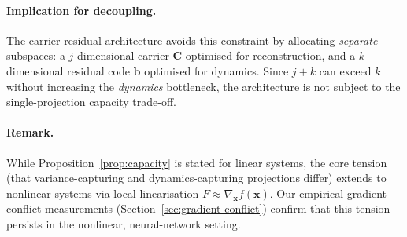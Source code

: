 \paragraph{Implication for decoupling.}
The carrier-residual architecture avoids this constraint by allocating
\emph{separate} subspaces: a $j$-dimensional carrier $\mathbf{C}$
optimised for reconstruction, and a $k$-dimensional residual code
$\mathbf{b}$ optimised for dynamics.  Since $j + k$ can exceed $k$
without increasing the \emph{dynamics} bottleneck, the architecture
is not subject to the single-projection capacity trade-off.

\paragraph{Remark.}
While Proposition~\ref{prop:capacity} is stated for linear systems, the
core tension (that variance-capturing and dynamics-capturing projections
differ) extends to nonlinear systems via local linearisation
$F \approx \nabla_{\mathbf{x}} f(\mathbf{x})$.  Our empirical gradient
conflict measurements (Section~\ref{sec:gradient-conflict}) confirm that
this tension persists in the nonlinear, neural-network setting.
